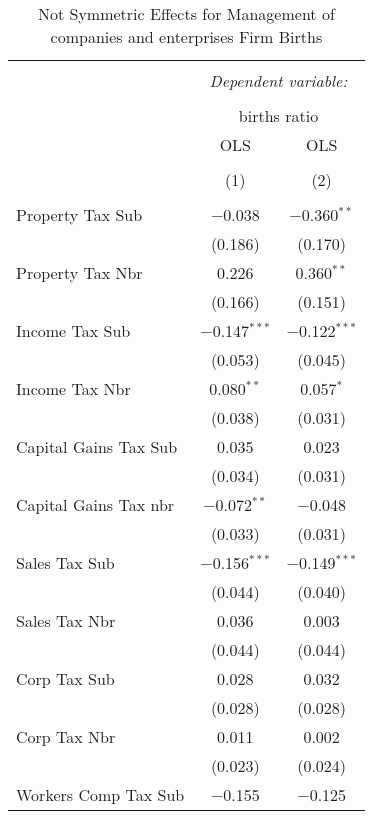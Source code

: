 
\begin{table}[!htbp] \centering 
  \caption{Not Symmetric Effects for  Management of companies and enterprises Firm Births} 
  \label{55noequality} 
\begin{tabular}{@{\extracolsep{5pt}}lcc} 
\\[-1.8ex]\hline 
\hline \\[-1.8ex] 
 & \multicolumn{2}{c}{\textit{Dependent variable:}} \\ 
\cline{2-3} 
\\[-1.8ex] & \multicolumn{2}{c}{births ratio} \\ 
 & OLS & OLS \\ 
\\[-1.8ex] & (1) & (2)\\ 
\hline \\[-1.8ex] 
 Property Tax Sub & $-$0.038 & $-$0.360$^{**}$ \\ 
  & (0.186) & (0.170) \\ 
  Property Tax Nbr & 0.226 & 0.360$^{**}$ \\ 
  & (0.166) & (0.151) \\ 
  Income Tax Sub & $-$0.147$^{***}$ & $-$0.122$^{***}$ \\ 
  & (0.053) & (0.045) \\ 
  Income Tax Nbr & 0.080$^{**}$ & 0.057$^{*}$ \\ 
  & (0.038) & (0.031) \\ 
  Capital Gains Tax Sub & 0.035 & 0.023 \\ 
  & (0.034) & (0.031) \\ 
  Capital Gains Tax nbr & $-$0.072$^{**}$ & $-$0.048 \\ 
  & (0.033) & (0.031) \\ 
  Sales Tax Sub & $-$0.156$^{***}$ & $-$0.149$^{***}$ \\ 
  & (0.044) & (0.040) \\ 
  Sales Tax Nbr & 0.036 & 0.003 \\ 
  & (0.044) & (0.044) \\ 
  Corp Tax Sub & 0.028 & 0.032 \\ 
  & (0.028) & (0.028) \\ 
  Corp Tax Nbr & 0.011 & 0.002 \\ 
  & (0.023) & (0.024) \\ 
  Workers Comp Tax Sub & $-$0.155 & $-$0.125 \\ 

\end{tabular}
\end{table}
